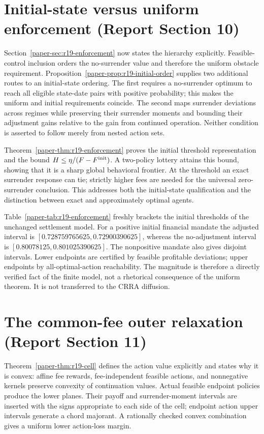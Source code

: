 \section{Initial-state versus uniform enforcement (Report Section 10)}
Section~\ref{paper-sec:r19-enforcement} now states the hierarchy explicitly. Feasible-control inclusion orders the no-surrender value and therefore the uniform obstacle requirement. Proposition~\ref{paper-prop:r19-initial-order} supplies two additional routes to an initial-state ordering. The first requires a no-surrender optimum to reach all eligible state-date pairs with positive probability; this makes the uniform and initial requirements coincide. The second maps surrender deviations across regimes while preserving their surrender moments and bounding their adjustment gains relative to the gain from continued operation. Neither condition is asserted to follow merely from nested action sets.

Theorem~\ref{paper-thm:r19-enforcement} proves the initial threshold representation and the bound $H\leq\eta/(F-F^{\rm init})$. A two-policy lottery attains this bound, showing that it is a sharp global behavioral frontier. At the threshold an exact surrender response can tie; strictly higher fees are needed for the universal zero-surrender conclusion. This addresses both the initial-state qualification and the distinction between exact and approximately optimal agents.

Table~\ref{paper-tab:r19-enforcement} freshly brackets the initial thresholds of the unchanged settlement model. For a positive initial financial mandate the adjusted interval is $[0.728759765625,0.72900390625]$, whereas the no-adjustment interval is $[0.80078125,0.801025390625]$. The nonpositive mandate also gives disjoint intervals. Lower endpoints are certified by feasible profitable deviations; upper endpoints by all-optimal-action reachability. The magnitude is therefore a directly verified fact of the finite model, not a rhetorical consequence of the uniform theorem. It is not transferred to the CRRA diffusion.

\section{The common-fee outer relaxation (Report Section 11)}
Theorem~\ref{paper-thm:r19-cell} defines the action value explicitly and states why it is convex: affine fee rewards, fee-independent feasible actions, and nonnegative kernels preserve convexity of continuation values. Actual feasible endpoint policies produce the lower planes. Their payoff and surrender-moment intervals are inserted with the signs appropriate to each side of the cell; endpoint action upper intervals generate a chord majorant. A rationally checked convex combination gives a uniform lower action-loss margin.

